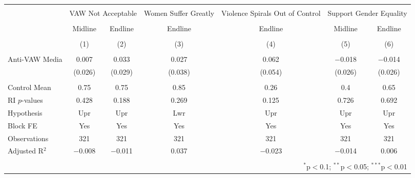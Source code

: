 
\begin{tabular}{@{\extracolsep{5pt}}lcccccc} 
\\[-1.8ex]\hline 
\hline \\[-1.8ex] 
 & \multicolumn{2}{c}{VAW Not Acceptable} & Women Suffer Greatly & Violence Spirals Out of Control & \multicolumn{2}{c}{Support Gender Equality} \\ 
\\[-1.8ex] & Midline & Endline & Endline & Endline & Midline & Endline \\ 
\\[-1.8ex] & (1) & (2) & (3) & (4) & (5) & (6)\\ 
\hline \\[-1.8ex] 
 Anti-VAW Media & 0.007 & 0.033 & 0.027 & 0.062 & $-$0.018 & $-$0.014 \\ 
  & (0.026) & (0.029) & (0.038) & (0.054) & (0.026) & (0.026) \\ 
 \hline \\[-1.8ex] 
Control Mean & 0.75 & 0.75 & 0.85 & 0.26 & 0.4 & 0.65 \\ 
RI $p$-values & 0.428 & 0.188 & 0.269 & 0.125 & 0.726 & 0.692 \\ 
Hypothesis & Upr & Upr & Lwr & Upr & Upr & Upr \\ 
Block FE & Yes & Yes & Yes & Yes & Yes & Yes \\ 
Observations & 321 & 321 & 321 & 321 & 321 & 321 \\ 
Adjusted R$^{2}$ & $-$0.008 & $-$0.011 & 0.037 & $-$0.023 & $-$0.014 & 0.006 \\ 
\hline 
\hline \\[-1.8ex] 
\multicolumn{7}{r}{$^{*}$p$<$0.1; $^{**}$p$<$0.05; $^{***}$p$<$0.01} \\ 
\end{tabular} 
